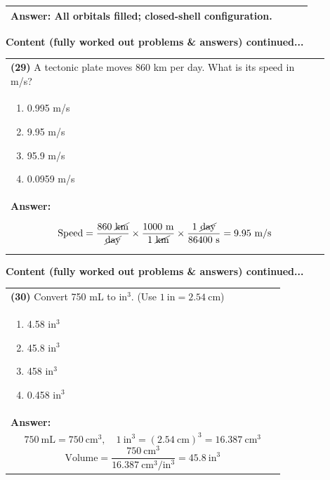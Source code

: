 \documentclass{article}
\begin{document}
\begin{tabular}{|p{0.9\linewidth}|}
\textbf{Answer:} All orbitals filled; closed-shell configuration.
\vspace{0.2cm}
\\
\hline
\end{tabular}

\newpage
\noindent
{\large\textbf{Content (fully worked out problems \& answers) continued...}}\\[0.2em]
\vspace{0.2cm}
\begin{tabular}{|p{0.9\linewidth}|}
\hline
\vspace{0.2cm}
\textbf{(29)} A tectonic plate moves 860 km per day. What is its speed in m/s?\\
\begin{minipage}[t]{0.85\linewidth}
\begin{enumerate}[label=\alph*.]
   \item 0.995 m/s
   \item 9.95 m/s
   \item 95.9 m/s
   \item 0.0959 m/s
\end{enumerate}
\end{minipage}\\
\hline
\vspace{0.2cm}
\textbf{Answer:}\\
\[
\text{Speed}=\frac{860~\cancel{\text{km}}}{\cancel{\text{day}}}\times\frac{1000~\text{m}}{1~\cancel{\text{km}}}\times\frac{1~\cancel{\text{day}}}{86400~\text{s}}=9.95~\text{m/s}
\] \\
\hline
\end{tabular}

\newpage
\noindent
{\large\textbf{Content (fully worked out problems \& answers) continued...}}\\[0.2em]
\vspace{0.2cm}
\begin{tabular}{|p{0.9\linewidth}|}
\hline
\vspace{0.2cm}
\textbf{(30)} Convert 750 mL to $\text{in}^3$. (Use $1~\text{in}=2.54~\text{cm}$)\\
\begin{minipage}[t]{0.85\linewidth}
\begin{enumerate}[label=\alph*.]
   \item 4.58 $\text{in}^3$
   \item 45.8 $\text{in}^3$
   \item 458 $\text{in}^3$
   \item 0.458 $\text{in}^3$
\end{enumerate}
\end{minipage}\\
\hline
\vspace{0.2cm}
\textbf{Answer:}\\
\[
750~\text{mL}=750~\text{cm}^3,\quad 1~\text{in}^3=(2.54~\text{cm})^3=16.387~\text{cm}^3
\]
\[
\text{Volume}=\frac{750~\text{cm}^3}{16.387~\text{cm}^3/\text{in}^3}=45.8~\text{in}^3
\] \\
\hline
\end{tabular}
\end{document}
